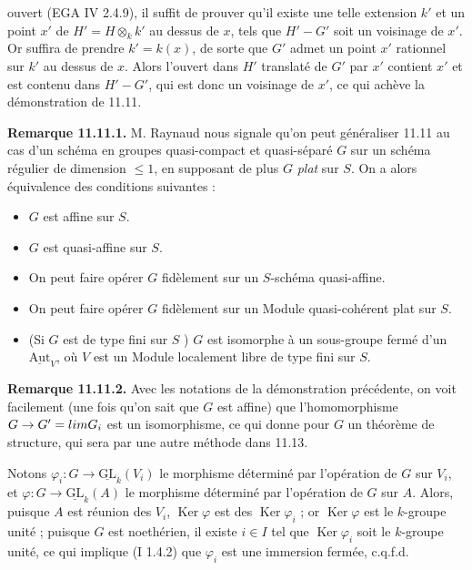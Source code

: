 \documentclass[11pt,a4paper]{article}
\begin{document}
ouvert (EGA IV 2.4.9), il  suffit de prouver qu'il existe une
telle extension $k'$ et un point $x'$ de $H' = H \otimes_{k} k'$ au dessus
de $x$, tels que $H' - G'$ soit un voisinage de $x'$. Or 
suffira de prendre \struck{\ill{}} $k' = k(x)$, de sorte que $G'$ admet un
point $x'$ rationnel sur $k'$ au dessus de $x$. Alors l'ouvert dans $H'$
translaté de $G'$ par $x'$ contient $x'$ et est contenu dans $H' - G'$,
\struck{\ill{}} qui est donc un voisinage de $x'$, ce qui achève la
démonstration de 11.11.

\textbf{Remarque 11.11.1.}  M. Raynaud nous signale qu'on
peut généraliser 11.11 au cas d'un schéma en groupes quasi-compact et
quasi-séparé $G$ sur un schéma  régulier de
dimension $\leqslant 1$, en supposant de plus $G$ \emph{plat} sur $S$. On a
alors équivalence des conditions suivantes :
\begin{itemize}
\item[(i)] $G$ est affine sur $S$.
\item[(ii)] $G$ est quasi-affine sur $S$.
\item[(iii)] On peut faire opérer $G$ fidèlement sur un $S$-schéma
quasi-affine.
\item[(iv)] On peut faire opérer $G$ fidèlement sur un Module
quasi-cohérent plat sur $S$.
\item[(v)] (Si $G$ est de type fini sur $S$ ) $G$
est isomorphe à un sous-groupe fermé d'un $\underline{\mathrm{Aut}}_{V}$,
où $V$ est un Module localement libre de type fini sur $S$.
\end{itemize}

\textbf{Remarque 11.11.2.} Avec les notations de la démonstration
précédente, on voit facilement (une fois qu'on sait que $G$ est affine) que
l'homomorphisme $G \to G' = \varprojlim G_{i}$ est un isomorphisme, ce qui
donne pour $G$ un théorème de structure, qui sera 
 par une autre méthode dans 11.13.


Notons $\varphi_{i} : G \longrightarrow \underline{\mathrm{GL}}_{k}(V_{i})$
le morphisme déterminé par l'opération de $G$ sur $V_{i}$, et
$\varphi : G \to \underline{\mathrm{GL}}_{k}(A)$ le morphisme déterminé par
l'opération de $G$ sur $A$. Alors, puisque $A$ est réunion des $V_{i}$,
$\operatorname{Ker} \varphi$ est  des
$\operatorname{Ker} \varphi_{i}$ ; or $\operatorname{Ker} \varphi$ est le
$k$-groupe unité ; puisque $G$ est noethérien, il existe $i \in I$ tel que
$\operatorname{Ker} \varphi_{i}$ soit le $k$-groupe unité, ce qui implique
(I 1.4.2) que $\varphi_{i}$ est une immersion fermée, c.q.f.d.
\end{document}
